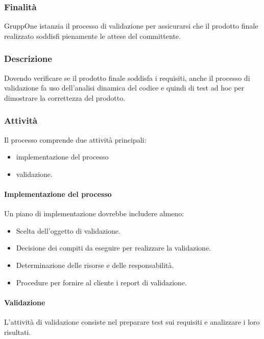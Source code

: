 \documentclass[../../norme-di-progetto.tex]{subfiles}
\begin{document}
\subsubsection{Finalità}%
\label{subs:validazione/finalita}

GruppOne istanzia il processo di validazione per assicurarsi che il prodotto finale realizzato soddisfi pienamente le attese del committente.

\subsubsection{Descrizione}%
\label{subs:validazione/descrizione}

Dovendo verificare se il prodotto finale soddisfa i requisiti, anche il processo di validazione fa uso dell'analisi dinamica del codice e quindi di test ad hoc per dimostrare la correttezza del prodotto.

\subsubsection{Attività}%
\label{subs:attivita}

Il processo comprende due attività principali:

\begin{itemize}
\item implementazione del processo
\item validazione.
\end{itemize}

\paragraph{Implementazione del processo}%
\label{subs:validazione/implementazione}
Un piano di implementazione dovrebbe includere almeno:
\begin{itemize}
  \item Scelta dell'oggetto di validazione.
  \item Decisione dei compiti da eseguire per realizzare la validazione.
  \item Determinazione delle risorse e delle responsabilità.
  \item Procedure per fornire al cliente i report di validazione.
\end{itemize}

\paragraph{Validazione}
L'attività di validazione consiste nel preparare test sui requisiti e analizzare i loro risultati.
\end{document}
